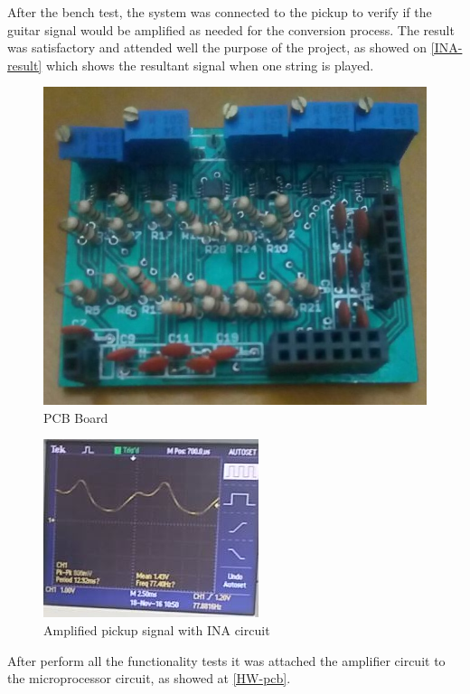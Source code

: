 After the bench test, the system was connected to the pickup to verify if the guitar signal would be
amplified as needed for the conversion process. The result was satisfactory and
attended well the purpose of the project, as showed on \autoref{INA-result} which shows
the resultant signal when one string is played.

\begin{figure}[!htpb]
  \centering
  \caption{PCB Board}
  \label{assembled-pcb}
  \includegraphics[scale=0.3]{images/INA/assembled-pcb.jpeg}
\end{figure}

\begin{figure}[!htpb]
\centering
\caption{Amplified pickup signal with INA circuit}
\label{INA-result}
\includegraphics[scale=1]{images/INA/result}
\end{figure}

After perform all the functionality tests it was attached the amplifier circuit to the microprocessor
circuit, as showed at \autoref{HW-pcb}.

